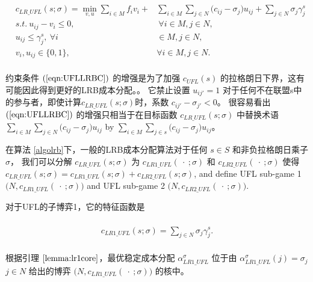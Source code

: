 \documentclass[UTF8]{article}
\begin{document}
\begin{定义}
\begin{eqnarray*}\label{eqn:LRPGCF}
\begin{aligned}
\begin{split}
c_{LR\_UFL}(s;\sigma) = \min_{v,u} \sum_{i \in M} f_iv_i + &\sum_{i \in M} \sum_{j \in N} \big(c_{ij} - \sigma_{j}\big)u_{ij} + \sum_{j \in N} \sigma_j \gamma_j^s\\
s.t.~u_{ij} - v_i \leq 0,&~\forall i \in M, j \in N,\\
u_{ij} \leq \gamma_j^s,~\forall i& \in M, j \in N,\\
v_i,u_{ij} \in \{0,1\},~&\forall i \in M, j \in N.
\end{split}
\end{aligned}
\end{eqnarray*}

约束条件 $(\ref{eqn:UFLLRBC})$ 的增强是为了加强 $c_{UFL}(s)$ 的拉格朗日下界，这有可能因此得到更好的LRB成本分配。。
它禁止设置 $u_{ij'}=1$ 对于任何不在联盟s中的参与者，即使计算$c_{LR\_UFL}(s;\sigma)$时，系数 $c_{ij'}- \sigma_{j'}<0$。
很容易看出 $(\ref{eqn:UFLLRBC})$ 的增强只相当于在目标函数 $c_{LR\_UFL}(s;\sigma)$ 中替换术语 $\sum_{i \in M} \sum_{j \in N} \big(c_{ij} - \sigma_{j}\big)u_{ij}$ by $\sum_{i \in M} \sum_{j \in s} \big(c_{ij} - \sigma_{j}\big)u_{ij}$。

在算法 \ref{algolrb}下，一般的LRB成本分配算法对于任何 $s \in S$ 和非负拉格朗日乘子 $\sigma$， 我们可以分解 $c_{LR\_UFL}(s;\sigma)$ 为 $c_{LR1\_UFL}(\ \cdot \ ;\sigma)$ 和 $c_{LR2\_UFL}(\ \cdot \ ;\sigma)$ 使得 $c_{LR\_UFL}(s;\sigma) = c_{LR1\_UFL}(s;\sigma) + c_{LR2\_UFL}(s;\sigma)$, and define UFL sub-game 1 $\big(N,c_{LR1\_UFL}(\ \cdot \ ;\sigma)\big)$ and UFL sub-game 2  $\big(N,c_{LR2\_UFL}(\ \cdot \ ;\sigma)\big)$.

对于UFL的子博弈1，它的特征函数是

\begin{eqnarray}\label{eqn:UFLCFsub1}
\begin{aligned}
\begin{split}
c_{LR1\_UFL}(s;\sigma) = \sum_{j \in N} \sigma_j \gamma_j^s.
\end{split}
\end{aligned}
\end{eqnarray}

根据引理 $\ref{lemma:lr1core}$，最优稳定成本分配 $\alpha_{LR1\_UFL}^{\sigma}$ 位于由 $\alpha_{LR1\_UFL}^{\sigma}(j) = \sigma_j$ $j \in N$ 给出的博弈 $\big(N, c_{LR1\_UFL}(\ \cdot \ ;\sigma)\big)$ 的核中。


\end{定义}
\end{document}
